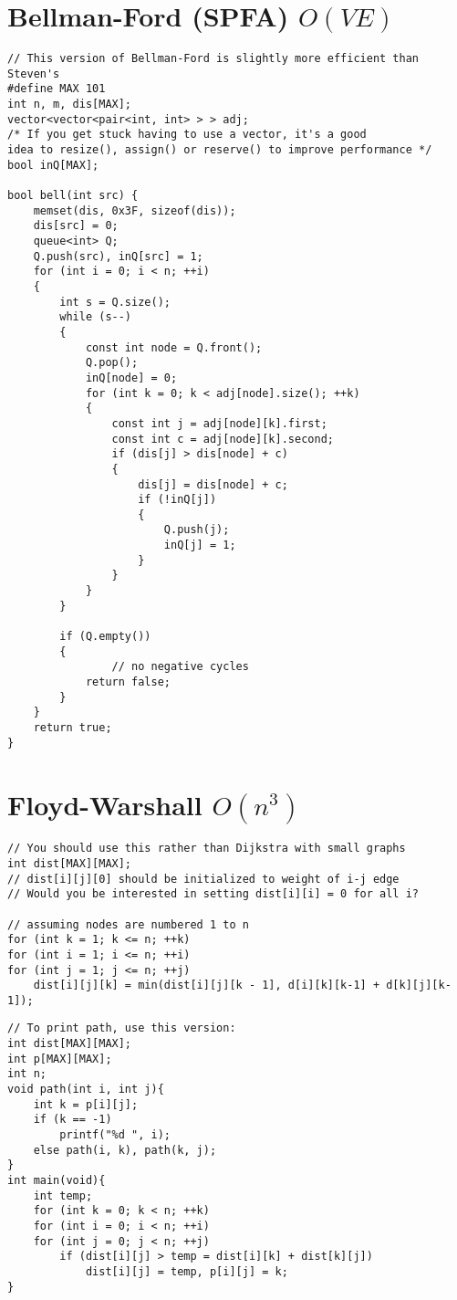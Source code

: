 \documentclass[12pt]{book}
\begin{document}
\section{Bellman-Ford (SPFA) $O(VE)$}
\begin{verbatim}
// This version of Bellman-Ford is slightly more efficient than Steven's
#define MAX 101
int n, m, dis[MAX];
vector<vector<pair<int, int> > > adj;
/* If you get stuck having to use a vector, it's a good
idea to resize(), assign() or reserve() to improve performance */
bool inQ[MAX];

bool bell(int src) {
    memset(dis, 0x3F, sizeof(dis));
    dis[src] = 0;
    queue<int> Q;
	Q.push(src), inQ[src] = 1;
    for (int i = 0; i < n; ++i)
    {
        int s = Q.size();
        while (s--)
        {
            const int node = Q.front();
            Q.pop();
            inQ[node] = 0;
            for (int k = 0; k < adj[node].size(); ++k)
            {
                const int j = adj[node][k].first;
                const int c = adj[node][k].second;
                if (dis[j] > dis[node] + c)
                {
                    dis[j] = dis[node] + c;
                    if (!inQ[j])
                    {
                        Q.push(j);
                        inQ[j] = 1;
                    }
                }
            }
        }
        
        if (Q.empty())
        {
        		// no negative cycles
            return false;
        }
    }
    return true;
}
\end{verbatim}
\section{Floyd-Warshall $O(n^3)$}
\begin{verbatim}
// You should use this rather than Dijkstra with small graphs
int dist[MAX][MAX];
// dist[i][j][0] should be initialized to weight of i-j edge
// Would you be interested in setting dist[i][i] = 0 for all i?

// assuming nodes are numbered 1 to n
for (int k = 1; k <= n; ++k)
for (int i = 1; i <= n; ++i)
for (int j = 1; j <= n; ++j)
	dist[i][j][k] = min(dist[i][j][k - 1], d[i][k][k-1] + d[k][j][k-1]);
\end{verbatim}
\begin{verbatim}
// To print path, use this version:
int dist[MAX][MAX];
int p[MAX][MAX];
int n;
void path(int i, int j){
	int k = p[i][j];
	if (k == -1)
		printf("%d ", i);
	else path(i, k), path(k, j);
}
int main(void){
	int temp;
	for (int k = 0; k < n; ++k)
	for (int i = 0; i < n; ++i)
	for (int j = 0; j < n; ++j)
		if (dist[i][j] > temp = dist[i][k] + dist[k][j])
			dist[i][j] = temp, p[i][j] = k;
}
\end{verbatim}
\end{document}
